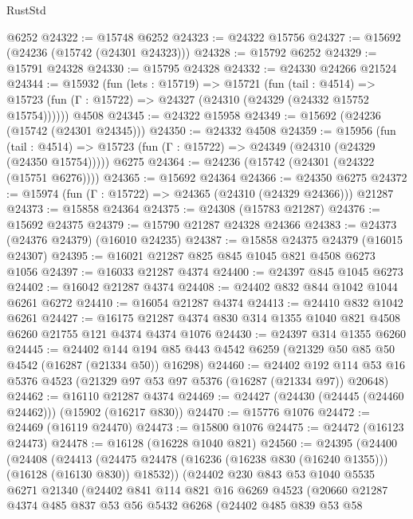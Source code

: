 \begin{lexlean}{RustStd}
\begin{coremodule}
    @6252
@24322 := @15748 @6252
@24323 := @24322 @15756
@24327 := @15692 (@24236 (@15742 (@24301 @24323)))
@24328 := @15792 @6252
@24329 := @15791 @24328
@24330 := @15795 @24328
@24332 := @24330 @24266 @21524
@24344 := @15932
    (fun (lets : @15719) =>
    @15721
      (fun (tail : @4514) =>
      @15723 (fun (Γ : @15722) => @24327 (@24310 (@24329 (@24332 @15752 @15754))))))
    @4508
@24345 := @24322 @15958
@24349 := @15692 (@24236 (@15742 (@24301 @24345)))
@24350 := @24332 @4508
@24359 := @15956
    (fun (tail : @4514) => @15723 (fun (Γ : @15722) => @24349 (@24310 (@24329 (@24350 @15754)))))
    @6275
@24364 := @24236 (@15742 (@24301 (@24322 (@15751 @6276))))
@24365 := @15692 @24364
@24366 := @24350 @6275
@24372 := @15974 (fun (Γ : @15722) => @24365 (@24310 (@24329 @24366))) @21287
@24373 := @15858 @24364
@24375 := @24308 (@15783 @21287)
@24376 := @15692 @24375
@24379 := @15790 @21287 @24328 @24366
@24383 := @24373 (@24376 @24379) (@16010 @24235)
@24387 := @15858 @24375 @24379 (@16015 @24307)
@24395 := @16021 @21287 @825 @845 @1045 @821 @4508 @6273 @1056
@24397 := @16033 @21287 @4374
@24400 := @24397 @845 @1045 @6273
@24402 := @16042 @21287 @4374
@24408 := @24402 @832 @844 @1042 @1044 @6261 @6272
@24410 := @16054 @21287 @4374
@24413 := @24410 @832 @1042 @6261
@24427 := @16175 @21287 @4374 @830 @314 @1355 @1040 @821 @4508 @6260 @21755 @121 @4374 @4374 @1076
@24430 := @24397 @314 @1355 @6260
@24445 := @24402
    @144
    @194
    @85
    @443
    @4542
    @6259
    (@21329 @50 @85 @50 @4542 (@16287 (@21334 @50)) @16298)
@24460 := @24402
    @192
    @114
    @53
    @16
    @5376
    @4523
    (@21329 @97 @53 @97 @5376 (@16287 (@21334 @97)) @20648)
@24462 := @16110 @21287 @4374
@24469 := @24427 (@24430 (@24445 (@24460 @24462))) (@15902 (@16217 @830))
@24470 := @15776 @1076
@24472 := @24469 (@16119 @24470)
@24473 := @15800 @1076
@24475 := @24472 (@16123 @24473)
@24478 := @16128 (@16228 @1040 @821)
@24560 := @24395
    (@24400
      (@24408
        (@24413 (@24475 @24478 (@16236 (@16238 @830 (@16240 @1355))) (@16128 (@16130 @830)) @18532))
        (@24402
          @230
          @843
          @53
          @1040
          @5535
          @6271
          @21340
          (@24402
            @841
            @114
            @821
            @16
            @6269
            @4523
            (@20660
              @21287
              @4374
              @485
              @837
              @53
              @56
              @5432
              @6268
              (@24402
                @485
                @839
                @53
                @58

\end{coremodule}
\end{lexlean}
